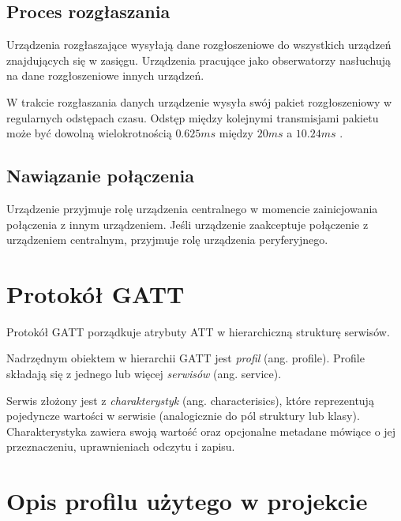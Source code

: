 \subsection{Proces rozgłaszania}

Urządzenia rozgłaszające wysyłają dane rozgłoszeniowe do wszystkich urządzeń
znajdujących się w zasięgu. Urządzenia pracujące jako obserwatorzy nasłuchują na
dane rozgłoszeniowe innych urządzeń.

W trakcie rozgłaszania danych urządzenie wysyła swój pakiet rozgłoszeniowy
w regularnych odstępach czasu. Odstęp między kolejnymi transmisjami pakietu może
być dowolną wielokrotnością $0.625ms$ między $20ms$ a $10.24ms$
\cite{bluetooth42}.

\subsection{Nawiązanie połączenia}

Urządzenie przyjmuje rolę urządzenia centralnego w momencie zainicjowania
połączenia z innym urządzeniem. Jeśli urządzenie zaakceptuje połączenie
z urządzeniem centralnym, przyjmuje rolę urządzenia peryferyjnego.

\section{Protokół GATT}

Protokół GATT porządkuje atrybuty ATT w hierarchiczną strukturę serwisów.

Nadrzędnym obiektem w hierarchii GATT jest \emph{profil} (ang. profile). Profile
składają się z jednego lub więcej \emph{serwisów} (ang. service).

Serwis złożony jest z \emph{charakterystyk} (ang. characterisics), które
reprezentują pojedyncze wartości w serwisie (analogicznie do pól struktury lub
klasy). Charakterystyka zawiera swoją wartość oraz opcjonalne metadane mówiące
o jej przeznaczeniu, uprawnieniach odczytu i zapisu.

\section{Opis profilu użytego w projekcie}

